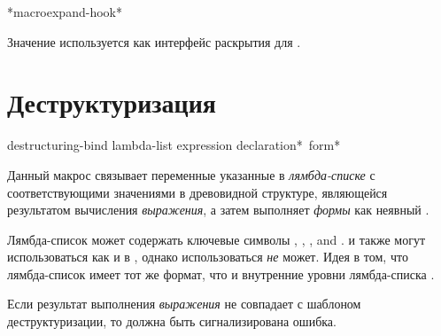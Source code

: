 \begin{defun}[Переменная]
*macroexpand-hook*

Значение  используется как интерфейс раскрытия для
.
\end{defun}

\section{Деструктуризация}

\begin{defmac}
destructuring-bind lambda-list expression {declaration}* {\,form}*

   Данный макрос связывает переменные указанные в \emph{лямбда-списке} с
   соответствующими значениями в древовидной структуре, являющейся результатом
   вычисления \emph{выражения}, а затем выполняет \emph{формы} как неявный .

Лямбда-список может содержать ключевые символы , , 
, and .
 и  также могут использоваться как и в ,
однако  использоваться \emph{не} может.
Идея в том, что лямбда-список  имеет тот же формат, что
и внутренние уровни лямбда-списка .

Если результат выполнения \emph{выражения} не совпадает с шаблоном
деструктуризации, то должна быть сигнализирована ошибка.
\end{defmac}

\fi